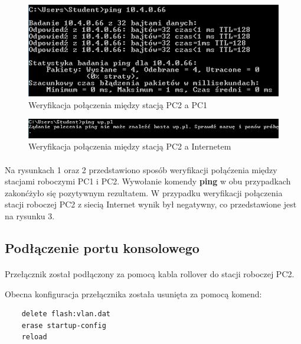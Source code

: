 \documentclass[wide,a4paper,titlepage,12pt] {article}
\begin{document}
  \begin{figure}[H]
    \begin{center}
      \includegraphics[width=\textwidth]{img/t1.PNG}
      \caption{Weryfikacja połączenia między stacją PC2 a PC1}
    \end{center}
  \end{figure}

  \begin{figure}[H]
    \begin{center}
      \includegraphics[width=\textwidth]{img/t2.PNG}
      \caption{Weryfikacja połączenia między stacją PC2 a Internetem}
    \end{center}
  \end{figure}

  \paragraph{}
  Na rysunkach 1 oraz 2 przedstawiono sposób weryfikacji połąćzenia między stacjami roboczymi PC1 i PC2. Wywołanie komendy \textbf{ping} w obu przypadkach zakonćżyło się pozytywnym rezultatem. W przypadku weryfikacji połączenia stacji roboczej PC2 z siecią Internet wynik był negatywny, co przedstawione jest na rysunku 3.

  \subsection{Podłączenie portu konsolowego}
  \paragraph{}
  Przełącznik został podłączony za pomocą kabla rollover do stacji roboczej PC2.

  Obecna konfiguracja przełącznika została usunięta za pomocą komend:
  \begin{verbatim}
    delete flash:vlan.dat
    erase startup-config
    reload
  \end{verbatim}
\end{document}
